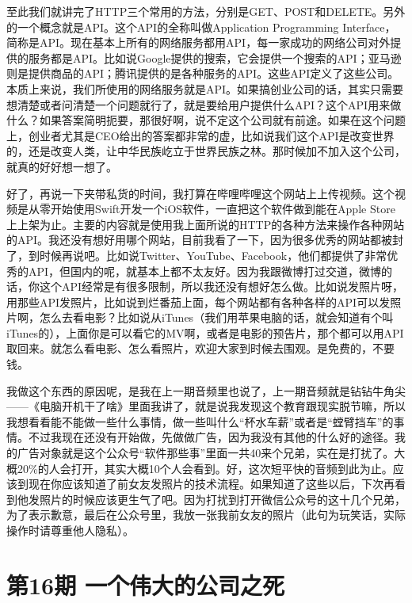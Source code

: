\documentclass[
  letterpaper,
  DIV=11,
  numbers=noendperiod]{scrreprt}
\begin{document}
至此我们就讲完了HTTP三个常用的方法，分别是GET、POST和DELETE。另外的一个概念就是API。这个API的全称叫做Application
Programming
Interface，简称是API。现在基本上所有的网络服务都用API，每一家成功的网络公司对外提供的服务都是API。比如说Google提供的搜索，它会提供一个搜索的API；亚马逊则是提供商品的API；腾讯提供的是各种服务的API。这些API定义了这些公司。本质上来说，我们所使用的网络服务就是API。如果搞创业公司的话，其实只需要想清楚或者问清楚一个问题就行了，就是要给用户提供什么API？这个API用来做什么？如果答案简明扼要，那很好啊，说不定这个公司就有前途。如果在这个问题上，创业者尤其是CEO给出的答案都非常的虚，比如说我们这个API是改变世界的，还是改变人类，让中华民族屹立于世界民族之林。那时候加不加入这个公司，就真的好好想一想了。

好了，再说一下夹带私货的时间，我打算在哔哩哔哩这个网站上上传视频。这个视频是从零开始使用Swift开发一个iOS软件，一直把这个软件做到能在Apple
Store上上架为止。主要的内容就是使用我上面所说的HTTP的各种方法来操作各种网站的API。我还没有想好用哪个网站，目前我看了一下，因为很多优秀的网站都被封了，到时候再说吧。比如说Twitter、YouTube、Facebook，他们都提供了非常优秀的API，但国内的呢，就基本上都不太友好。因为我跟微博打过交道，微博的话，你这个API经常是有很多限制，所以我还没有想好怎么做。比如说发照片呀，用那些API发照片，比如说到烂番茄上面，每个网站都有各种各样的API可以发照片啊，怎么去看电影？比如说从iTunes（我们用苹果电脑的话，就会知道有个叫iTunes的），上面你是可以看它的MV啊，或者是电影的预告片，那个都可以用API取回来。就怎么看电影、怎么看照片，欢迎大家到时候去围观。是免费的，不要钱。

我做这个东西的原因呢，是我在上一期音频里也说了，上一期音频就是钻钻牛角尖------《电脑开机干了啥》里面我讲了，就是说我发现这个教育跟现实脱节嘛，所以我想看看能不能做一些什么事情，做一些叫什么``杯水车薪''或者是``螳臂挡车''的事情。不过我现在还没有开始做，先做做广告，因为我没有其他的什么好的途径。我的广告对象就是这个公众号``软件那些事''里面一共40来个兄弟，实在是打扰了。大概20\%的人会打开，其实大概10个人会看到。好，这次短平快的音频到此为止。应该到现在你应该知道了前女友发照片的技术流程。如果知道了这些以后，下次再看到他发照片的时候应该更生气了吧。因为打扰到打开微信公众号的这十几个兄弟，为了表示歉意，最后在公众号里，我放一张我前女友的照片（此句为玩笑话，实际操作时请尊重他人隐私）。


\chapter{第16期
一个伟大的公司之死}\label{ux7b2c16ux671f-ux4e00ux4e2aux4f1fux5927ux7684ux516cux53f8ux4e4bux6b7b}
\end{document}
